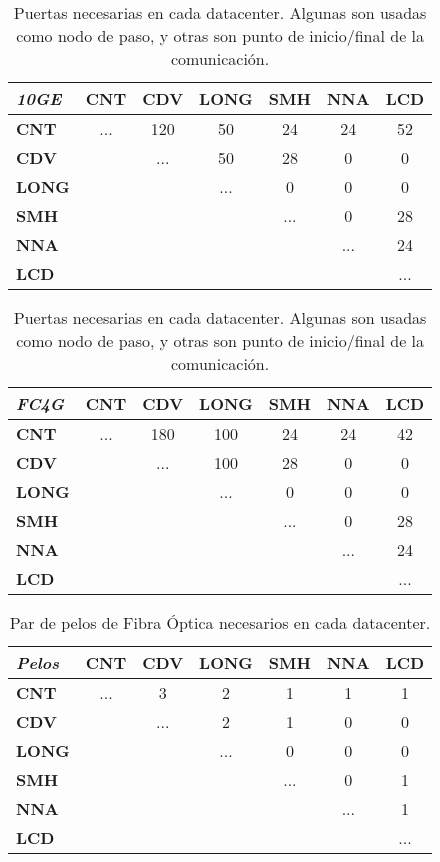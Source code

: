 \begin{table}[!hbt]
\centering
\begin{tabular}{|l | c  c  c  c  c  c|}
\hline
 \textbf{\textit{10GE}}& \textbf{CNT} & \textbf{CDV} & \textbf{LONG} & \textbf{SMH} & \textbf{NNA} & \textbf{LCD}  \\
\hline
\textbf{CNT} & ... & 120 & 50 & 24 & 24 & 52\\
\hline
\textbf{CDV} &  & ... & 50 & 28 & 0 & 0\\
\hline
\textbf{LONG} &  &  & ... & 0 & 0 & 0\\
\hline
\textbf{SMH} &  &  &  & ... & 0 & 28\\
\hline
\textbf{NNA} & & & & & ... & 24\\
\hline
\textbf{LCD} & & & & & & ... \\
\hline
\end{tabular}

\vspace*{5pt}

\begin{tabular}{|l | c  c  c  c  c  c|}
\hline
 \textbf{\textit{FC4G}}& \textbf{CNT} & \textbf{CDV} & \textbf{LONG} & \textbf{SMH} & \textbf{NNA} & \textbf{LCD}  \\
\hline
\textbf{CNT} & ... & 180 & 100 & 24 & 24 & 42\\
\hline
\textbf{CDV} &  & ... & 100 & 28 & 0 & 0\\
\hline
\textbf{LONG} &  &  & ... & 0 & 0 & 0\\
\hline
\textbf{SMH} &  &  &  & ... & 0 & 28\\
\hline
\textbf{NNA} & & & & & ... & 24\\
\hline
\textbf{LCD} & & & & & & ... \\
\hline
\end{tabular}
\caption[Puertas de cada DataCenter]{Puertas necesarias en cada datacenter. Algunas son usadas como nodo de paso, y otras son punto de inicio/final de la comunicación.}
\label{tab:puertas}
\end{table}

\begin{table}[!hbt]
\centering
\begin{tabular}{|l | c  c  c  c  c  c|}
\hline
 \textbf{\textit{Pelos}}& \textbf{CNT} & \textbf{CDV} & \textbf{LONG} & \textbf{SMH} & \textbf{NNA} & \textbf{LCD}  \\
\hline
\textbf{CNT} & ... & 3 & 2 & 1 & 1 & 1\\
\hline
\textbf{CDV} &  & ... & 2 & 1 & 0 & 0\\
\hline
\textbf{LONG} &  &  & ... & 0 & 0 & 0\\
\hline
\textbf{SMH} &  &  &  & ... & 0 & 1\\
\hline
\textbf{NNA} & & & & & ... & 1\\
\hline
\textbf{LCD} & & & & & & ... \\
\hline
\end{tabular}
\caption[Fibras de cada DataCenter]{Par de pelos de Fibra Óptica necesarios en cada datacenter.}
\label{tab:pelos}
\end{table}

